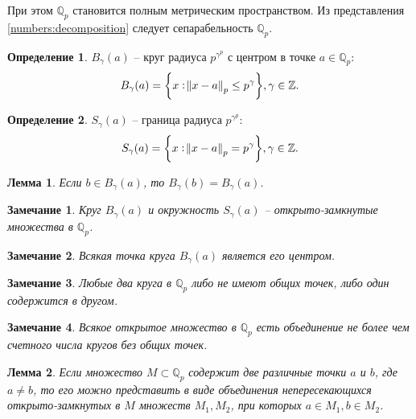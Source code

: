 \documentclass[master, och, diploma, times]{sty/SCWorks}
\theoremstyle{plain}
\newtheorem{lemma}{Лемма}[section]
\newtheorem{note}{Замечание}[section]
\theoremstyle{definition}
\newtheorem{defn}{Определение}[section]
\numberwithin{equation}{section}
\begin{document}
\noindent При этом $\mathbb {Q}_p$ становится полным метрическим пространством. Из представления \eqref{numbers:decomposition} следует сепарабельность $\mathbb {Q}_p$.  

\begin{defn}
$B_{\gamma}(a)$ -- круг радиуса $p^{\gamma^p}$ с центром в точке $a \in \mathbb {Q}_p$:
\begin{equation}
	B_\gamma(a) = \bigg\{x: \norm{x-a}_p \le p^{\gamma} \bigg\}, \gamma \in \mathbb {Z}.
\end{equation}
\end{defn}

\begin{defn}
$S_{\gamma}(a)$ -- граница радиуса $p^{\gamma^p}$:
\begin{equation}
	S_\gamma(a) = \bigg\{x: \norm{x-a}_p = p^{\gamma} \bigg\}, \gamma \in \mathbb {Z}.
\end{equation}
\end{defn}

\begin{lemma}
Если $b \in B_{\gamma}(a)$, то $B_{\gamma}(b)=B_{\gamma}(a)$.
\end{lemma}

\begin{note}
Круг $B_{\gamma}(a)$ и окружность $S_{\gamma}(a)$ -- открыто-замкнутые множества в $\mathbb {Q}_p$.
\end{note}

\begin{note}
Всякая точка круга $B_{\gamma}(a)$ является его центром.
\end{note}

\begin{note}
Любые два круга в $\mathbb {Q}_p$ либо не имеют общих точек, либо один содержится в другом.
\end{note}

\begin{note}
Всякое открытое множество в $\mathbb {Q}_p$ есть объединение не более чем счетного числа кругов без общих точек.
\end{note}

\begin{lemma} \label{lemma:2}
Если множество $M \subset \mathbb {Q}_p$ содержит две различные точки $a$ и $b$, где $a \ne b$, то его можно представить в виде объединения непересекающихся открыто-замкнутых в $M$ множеств $M_1, M_2$, при которых $a \in M_1, b \in M_2$\cite{bib:kozirev:2008}.
\end{lemma}
\end{document}
